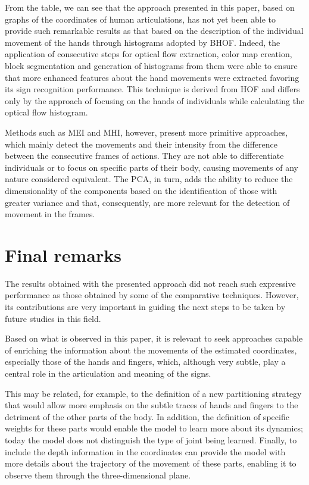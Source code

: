 From the table, we can see that the approach presented in this paper, based on graphs of the coordinates of human articulations, has not yet been able to provide such remarkable results as that based on the description of the individual movement of the hands through histograms adopted by BHOF. Indeed, the application of consecutive steps for optical flow extraction, color map creation, block segmentation and generation of histograms from them were able to ensure that more enhanced features about the hand movements were extracted favoring its sign recognition performance. This technique is derived from HOF and differs only by the approach of focusing on the hands of individuals while calculating the optical flow histogram.

Methods such as MEI and MHI, however, present more primitive approaches, which mainly detect the movements and their intensity from the difference between the consecutive frames of actions. They are not able to differentiate individuals or to focus on specific parts of their body, causing movements of any nature considered equivalent. The PCA, in turn, adds the ability to reduce the dimensionality of the components based on the identification of those with greater variance and that, consequently, are more relevant for the detection of movement in the frames.

\section{Final remarks} 
\label{sec:final-remarks}

The results obtained with the presented approach did not reach such expressive performance as those obtained by some of the comparative techniques. However, its contributions are very important in guiding the next steps to be taken by future studies in this field.

Based on what is observed in this paper, it is relevant to seek approaches capable of enriching the information about the movements of the estimated coordinates, especially those of the hands and fingers, which, although very subtle, play a central role in the articulation and meaning of the signs.

This may be related, for example, to the definition of a new partitioning strategy that would allow more emphasis on the subtle traces of hands and fingers to the detriment of the other parts of the body. In addition, the definition of specific weights for these parts would enable the model to learn more about its dynamics; today the model does not distinguish the type of joint being learned. Finally, to include the depth information in the coordinates can provide the model with more details about the trajectory of the movement of these parts, enabling it to observe them through the three-dimensional plane.